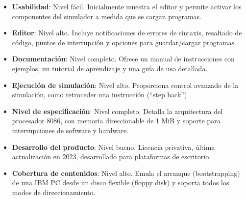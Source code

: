 \documentclass[12pt,oneside]{templates/unerthesis}
\providecommand{\tightlist}{%
  \setlength{\itemsep}{0pt}\setlength{\parskip}{0pt}}
\begin{document}
\begin{itemize}
\tightlist
\item
  \textbf{Usabilidad}: Nivel fácil. Inicialmente muestra el editor y permite activar los componentes del simulador a medida que se cargan programas.
\item
  \textbf{Editor}: Nivel alto. Incluye notificaciones de errores de sintaxis, resaltado de código, puntos de interrupción y opciones para guardar/cargar programas.
\item
  \textbf{Documentación}: Nivel completo. Ofrece un manual de instrucciones con ejemplos, un tutorial de aprendizaje y una guía de uso detallada.
\item
  \textbf{Ejecución de simulación}: Nivel alto. Proporciona control avanzado de la simulación, como retroceder una instrucción (``step back'').
\item
  \textbf{Nivel de especificación}: Nivel completo. Detalla la arquitectura del procesador 8086, con memoria direccionable de 1 MiB y soporte para interrupciones de software y hardware.
\item
  \textbf{Desarrollo del producto}: Nivel bueno. Licencia privativa, última actualización en 2023, desarrollado para plataformas de escritorio.
\item
  \textbf{Cobertura de contenidos}: Nivel alto. Emula el arranque (bootstrapping) de una IBM PC desde un disco flexible (floppy disk) y soporta todos los modos de direccionamiento.
\end{itemize}
\end{document}
